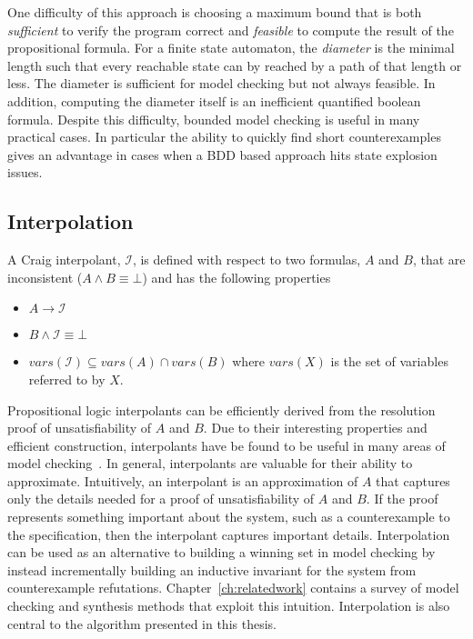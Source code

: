 One difficulty of this approach is choosing a maximum bound that is both \emph{sufficient} to verify the program correct and \emph{feasible} to compute the result of the propositional formula. For a finite state automaton, the \emph{diameter} is the minimal length such that every reachable state can by reached by a path of that length or less. The diameter is sufficient for model checking but not always feasible. In addition, computing the diameter itself is an inefficient quantified boolean formula. Despite this difficulty, bounded model checking is useful in many practical cases. In particular the ability to quickly find short counterexamples gives an advantage in cases when a BDD based approach hits state explosion issues.

\subsection{Interpolation}

A Craig interpolant, $\mathcal{I}$, is defined with respect to two formulas, $A$ and $B$, that are inconsistent ($A \land B \equiv \bot$) and has the following properties

\begin{itemize}
    \item $A \to \mathcal{I}$
    \item $B \land \mathcal{I} \equiv \bot$
    \item $vars(\mathcal{I}) \subseteq vars(A) \cap vars(B)$ where $vars(X)$ is the set of variables referred to by $X$.
\end{itemize}

Propositional logic interpolants can be efficiently derived from the resolution proof of unsatisfiability of $A$ and $B$. Due to their interesting properties and efficient construction, interpolants have be found to be useful in many areas of model checking~\cite{McMillan05}. In general, interpolants are valuable for their ability to approximate. Intuitively, an interpolant is an approximation of $A$ that captures only the details needed for a proof of unsatisfiability of $A$ and $B$. If the proof represents something important about the system, such as a counterexample to the specification, then the interpolant captures important details.  Interpolation can be used as an alternative to building a winning set in model checking by instead incrementally building an inductive invariant for the system from counterexample refutations. Chapter~\ref{ch:relatedwork} contains a survey of model checking and synthesis methods that exploit this intuition. Interpolation is also central to the algorithm presented in this thesis.
